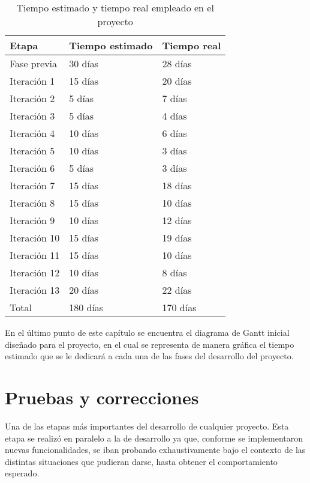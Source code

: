 \begin{table}[H]
\label{tiempo}
\begin{center}
\begin{tabular}{| l | l | l |}
\hline
Etapa & Tiempo estimado & Tiempo real\\
\hline \hline
Fase previa & 30 días & 28 días\\
\hline
Iteración 1 & 15 días & 20 días\\
\hline
Iteración 2 & 5 días & 7 días\\
\hline
Iteración 3 & 5 días & 4 días\\
\hline
Iteración 4 & 10 días & 6 días\\
\hline
Iteración 5 & 10 días & 3 días\\
\hline
Iteración 6 & 5 días & 3 días\\
\hline
Iteración 7 & 15 días & 18 días\\
\hline
Iteración 8 & 15 días & 10 días\\
\hline
Iteración 9 & 10 días & 12 días\\
\hline
Iteración 10 & 15 días & 19 días\\
\hline
Iteración 11 & 15 días & 10 días\\
\hline
Iteración 12 & 10 días & 8 días\\
\hline
Iteración 13 & 20 días & 22 días\\
\hline \hline
Total & 180 días & 170 días\\
\hline
\end{tabular}
\end{center}
\caption{Tiempo estimado y tiempo real empleado en el proyecto}
\end{table}

En el último punto de este capítulo se encuentra el diagrama de Gantt inicial diseñado para el proyecto, en el cual se representa de manera gráfica el tiempo estimado que se le dedicará a cada una de las fases del desarrollo del proyecto.

\section{Pruebas y correcciones}

Una de las etapas más importantes del desarrollo de cualquier proyecto. Esta etapa se realizó en paralelo a la de desarrollo ya que, conforme se implementaron nuevas funcionalidades, se iban probando exhaustivamente bajo el contexto de las distintas situaciones que pudieran darse, hasta obtener el comportamiento esperado.\\


